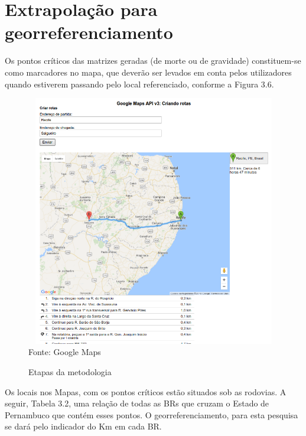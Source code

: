 \pagebreak

\section{Extrapolação para georreferenciamento}

Os pontos críticos das matrizes geradas (de morte ou de gravidade) constituem-se como marcadores no mapa, que deverão ser levados em conta pelos utilizadores quando estiverem passando pelo local referenciado, conforme a Figura 3.6.


\begin{figure}[ht]
	\centering
	\caption{Etapas da metodologia}
	\includegraphics[width=150mm, height=110mm]{Figuras/Cronograma/GoogleMaps.png}\\
	\tiny Fonte: Google Maps
\end{figure}


\pagebreak

Os locais nos Mapas, com os pontos críticos estão situados sob as rodovias. 
A seguir, Tabela 3.2, uma relação de todas as BRs que cruzam o Estado de Pernambuco que contém esses pontos. 
O georreferenciamento, para esta pesquisa se dará pelo indicador do Km em cada BR.

